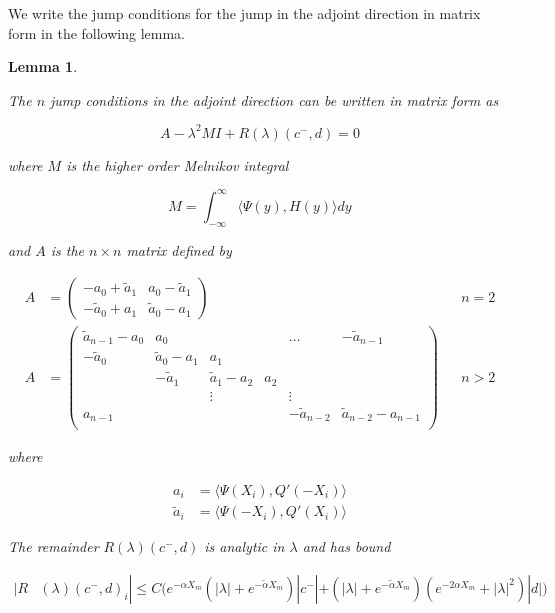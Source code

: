 \documentclass[12pt]{article}
\newtheorem{lemma}{Lemma}
\begin{document}
We write the jump conditions for the jump in the adjoint direction in matrix form in the following lemma.


\begin{lemma}\label{evpsol}

The $n$ jump conditions in the adjoint direction can be written in matrix form as

\begin{equation}\label{adjmatrix}
A - \lambda^2 MI + R(\lambda)(c^-, d) = 0
\end{equation}

where $M$ is the higher order Melnikov integral 

\begin{equation}
M =  \int_{-\infty}^\infty \langle \Psi(y), H(y) \rangle dy
\end{equation}

and $A$ is the $n \times n$ matrix defined by

\begin{align*}
A &= \begin{pmatrix}
-a_0 + \tilde{a}_1 & a_0 - \tilde{a}_1 \\
-\tilde{a}_0 + a_1 & \tilde{a}_0 - a_1
\end{pmatrix} && n = 2 \\
A &= \begin{pmatrix}
\tilde{a}_{n-1} - a_0 & a_0 & & & \dots & -\tilde{a}_{n-1}\\
-\tilde{a}_0 & \tilde{a}_0 - a_1 &  a_1 \\
& -\tilde{a}_1 & \tilde{a}_1 - a_2 &  a_2 \\
& & \vdots & & \vdots \\
a_{n-1} & & & & -\tilde{a}_{n-2} & \tilde{a}_{n-2} - a_{n-1} \\
\end{pmatrix} && n > 2
\end{align*}

where

\begin{align*}
a_i &= \langle \Psi(X_i), Q'(-X_i) \rangle \\
\tilde{a}_i &= \langle \Psi(-X_i), Q'(X_i) \rangle
\end{align*}

The remainder $R(\lambda)(c^-, d)$ is analytic in $\lambda$ and has bound

\begin{align*}
|R&(\lambda)(c^-, d)_i| \leq C \Big( e^{-\alpha X_m}(|\lambda| + e^{-\tilde{\alpha} X_m} )|c^-| + (|\lambda| + e^{-\tilde{\alpha} X_m} )( e^{-2 \alpha X_m} + |\lambda|^2)|d| \Big)
\end{align*}


\end{lemma}
\end{document}
